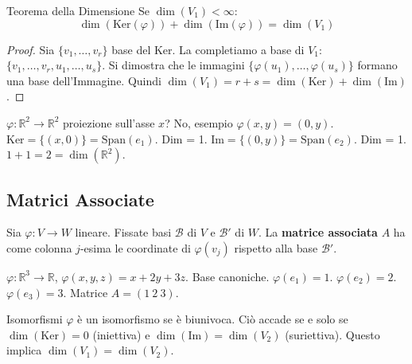\begin{concept}{Teorema della Dimensione}
Se $\dim(V_1) < \infty$:
$$ \dim(\text{Ker}(\varphi)) + \dim(\text{Im}(\varphi)) = \dim(V_1) $$
\end{concept}

\begin{proof}
Sia $\{v_1, \dots, v_r\}$ base del Ker. La completiamo a base di $V_1$: $\{v_1, \dots, v_r, u_1, \dots, u_s\}$.
Si dimostra che le immagini $\{\varphi(u_1), \dots, \varphi(u_s)\}$ formano una base dell'Immagine.
Quindi $\dim(V_1) = r+s = \dim(\text{Ker}) + \dim(\text{Im})$.
\end{proof}

\begin{exercisebox}[title={Esempio Nucleo/Immagine}]
$\varphi: \mathbb{R}^2 \to \mathbb{R}^2$ proiezione sull'asse $x$? No, esempio $\varphi(x,y) = (0, y)$.
$\text{Ker} = \{(x,0)\} = \text{Span}(e_1)$. Dim = 1.
$\text{Im} = \{(0,y)\} = \text{Span}(e_2)$. Dim = 1.
$1+1 = 2 = \dim(\mathbb{R}^2)$.
\end{exercisebox}

\subsection{Matrici Associate}
\begin{definitionbox}
Sia $\varphi: V \to W$ lineare. Fissate basi $\mathcal{B}$ di $V$ e $\mathcal{B}'$ di $W$.
La \textbf{matrice associata} $A$ ha come colonna $j$-esima le coordinate di $\varphi(v_j)$ rispetto alla base $\mathcal{B}'$.
\end{definitionbox}

\begin{exercisebox}[title={Calcolo Matrice Associata}]
$\varphi: \mathbb{R}^3 \to \mathbb{R}$, $\varphi(x,y,z) = x+2y+3z$.
Base canoniche.
$\varphi(e_1) = 1$.
$\varphi(e_2) = 2$.
$\varphi(e_3) = 3$.
Matrice $A = (1 \ 2 \ 3)$.
\end{exercisebox}

\begin{concept}{Isomorfismi}
$\varphi$ è un isomorfismo se è biunivoca.
Ciò accade se e solo se $\dim(\text{Ker}) = 0$ (iniettiva) e $\dim(\text{Im}) = \dim(V_2)$ (suriettiva).
Questo implica $\dim(V_1) = \dim(V_2)$.
\end{concept}
